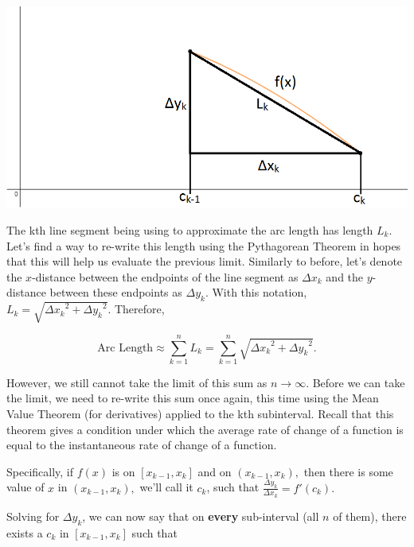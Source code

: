 \documentclass[handout,nooutcomes]{ximera}
\begin{document}
\begin{center} \includegraphics{generalpythagorean.png} \end{center}

The kth line segment being using to approximate the arc length has length $L_k$.  Let's find a way to re-write this length using the Pythagorean Theorem in hopes that this will help us evaluate the previous limit.  Similarly to before, let's denote the $x$-distance between the endpoints of the line segment as ${\Delta x}_k$ and the $y$-distance between these endpoints as ${\Delta y}_k$.  With this notation, $L_k = \sqrt{{{\Delta x}_k}^2+{{\Delta y}_k}^2}$.  Therefore, 

$$\text{Arc Length} \approx \displaystyle\sum_{k=1}^n L_k = \displaystyle\sum_{k=1}^n \sqrt{{{\Delta x}_k}^2+{{\Delta y}_k}^2}.$$

However, we still cannot take the limit of this sum as $n \to \infty$.  Before we can take the limit, we need to re-write this sum once again, this time using the Mean Value Theorem (for derivatives) applied to the kth subinterval.  Recall that this theorem gives a condition under which the average rate of change of a function is equal to the instantaneous rate of change of a function.

\begin{problem}
Specifically, if $f(x)$ is  on $[x_{k-1},x_k]$ and  on $(x_{k-1},x_k),$ then there is some value of $x$ in $(x_{k-1},x_k),$ we'll call it $c_k$, such that $\frac{\Delta y_k}{\Delta x_k} = f'(c_k).$ 
\end{problem}

Solving for $\Delta y_k$, we can now say that on \textbf{every} sub-interval (all $n$ of them), there exists a $c_k$ in $[x_{k-1}, x_k]$ such that
\end{document}
